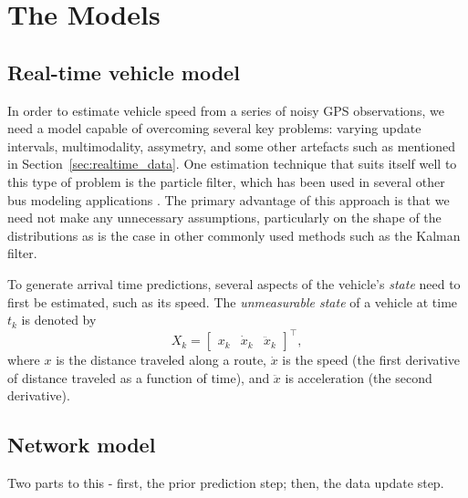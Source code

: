 \section{The Models}
\label{sec:models}

\subsection{Real-time vehicle model}
\label{sec:pf}

In order to estimate vehicle speed from a series of noisy GPS observations,
we need a model capable of overcoming several key problems:
varying update intervals, multimodality, assymetry, 
and some other artefacts such as mentioned in Section~\ref{sec:realtime_data}.
One estimation technique that suits itself well to this type of problem
is the particle filter, 
which has been used in several other bus modeling applications
\citep{Hans_2015}.
The primary advantage of this approach is that we need not make any 
unnecessary assumptions, particularly on the shape of the distributions 
as is the case in other commonly used methods such as the Kalman filter.


To generate arrival time predictions, 
several aspects of the vehicle's \emph{state} need to first be estimated,
such as its speed.
The \emph{unmeasurable state} of a vehicle at time $t_k$ is denoted by
\begin{equation}
    X_k = \begin{bmatrix} x_k & \dot x_k & \ddot x_k \end{bmatrix}^\top,
\end{equation}
where $x$ is the distance traveled along a route,
$\dot x$ is the speed (the first derivative of distance traveled as a function of time),
and $\ddot x$ is acceleration (the second derivative).




\subsection{Network model}
\label{sec:kf}

Two parts to this - first, the prior prediction step; then, the data update step.
